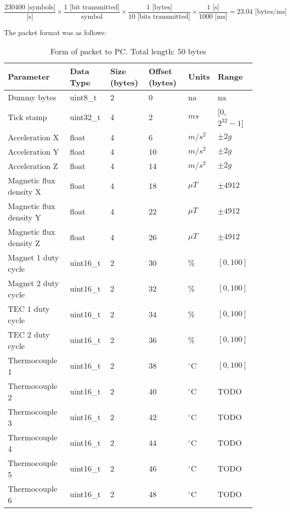 \documentclass{article}
\begin{document}
\begin{equation}\label{eq:byterate}
\frac{230400 \text{ [symbols]}}{\text{[s]}}
\times 
\frac{1 \text{ [bit \ transmitted]}}{\text{symbol}}
\times
\frac{1 \text{ [bytes]}}{10 \text{ [bits transmitted]}}
\times
\frac{1 \text{ [s]}}{1000 \text{ [ms]}}
=
23.04 \text{ [bytes/ms]}
\end{equation}


The packet format was as follows:

\begin{table}[!ht]
	\centering
	\begin{tabular}{ | m{4cm} | m{2cm} | m{2cm} | m{2cm}| m{1cm}| m{2cm}| } 
		\hline
		Parameter & Data Type & Size (bytes) & Offset (bytes) & Units & Range \\
		\hline
		Dummy bytes & uint8\_t & 2 & 0 & na & na \\
		\hline
		Tick stamp & uint32\_t & 4 & 2 & $ms$ & [0, $2^{32}-1$] \\ 
		\hline
		Acceleration X & float & 4 & 6 & $m/s^2$ & $\pm 2g$ \\ 
		\hline
		Acceleration Y & float & 4 & 10 & $m/s^2$ & $\pm 2g$ \\ 
		\hline
		Acceleration Z & float & 4 & 14 & $m/s^2$ & $\pm 2g$  \\ 
		\hline
		Magnetic flux density X & float & 4 & 18 & $\mu T$ & $\pm 4912$  \\ 
		\hline
		Magnetic flux density Y & float & 4 & 22 & $\mu T$ & $\pm 4912$  \\ 
		\hline
		Magnetic flux density Z & float & 4 & 26 & $\mu T$ & $\pm 4912$  \\ 
		\hline
		Magnet 1 duty cycle & uint16\_t & 2 & 30 & \% & $[0, 100]$  \\ 
		\hline
		Magnet 2 duty cycle & uint16\_t & 2 & 32 & \% & $[0, 100]$  \\ 
		\hline
	    TEC 1 duty cycle & uint16\_t & 2 & 34 & \% & $[0, 100]$  \\ 
		\hline
		TEC 2 duty cycle & uint16\_t & 2 & 36 & \% & $[0, 100]$  \\ 
		\hline
		Thermocouple 1 & uint16\_t & 2 & 38 & $^\circ$C & $[0, 100]$  \\ 
		\hline
		Thermocouple 2 & uint16\_t & 2 & 40 & $^\circ$C & TODO  \\ 
		\hline
		Thermocouple 3 & uint16\_t & 2 & 42 & $^\circ$C & TODO  \\ 
		\hline
		Thermocouple 4 & uint16\_t & 2 & 44 & $^\circ$C & TODO  \\ 
		\hline
		Thermocouple 5 & uint16\_t & 2 & 46 & $^\circ$C & TODO \\ 
		\hline
		Thermocouple 6 & uint16\_t & 2 & 48 & $^\circ$C & TODO \\ 
		\hline
		
	\end{tabular}
	\caption{Form of packet to PC. Total length: 50 bytes}
	\label{tab:PCPacketFormat}
\end{table}
\end{document}

